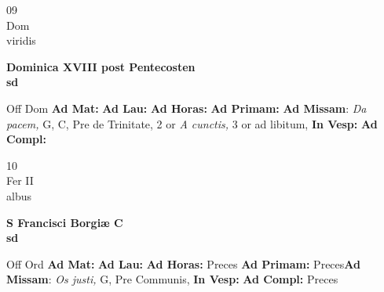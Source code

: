 \documentclass[10pt, openany]{book}
\begin{document}
    \begin{center}
        \begin{minipage}{3.5in}
            \vspace{2em}
            \begin{minipage}{0.5in}
                {\Huge 09} \\
                {\normalsize Dom} \\
                {\normalsize viridis}
            \end{minipage}
            \begin{minipage}{3.0in}
                \textbf{ \large Dominica XVIII post Pentecosten \\
                \textnormal{\normalsize sd}} \\ 
            \end{minipage}
            \begin{justify}Off Dom
                \textbf{Ad Mat: }
                \textbf{Ad Lau: }
                \textbf{Ad Horas: }
                \textbf{Ad Primam: }\textbf{Ad Missam}: \textit{Da pacem,} G, C, Pre de Trinitate, 2 or \textit{A cunctis,} 3 or ad libitum,  
                \textbf{In Vesp: }
                \textbf{Ad Compl: }
            \end{justify}
        \end{minipage}
    \end{center}

    \begin{center}
        \begin{minipage}{3.5in}
            \vspace{2em}
            \begin{minipage}{0.5in}
                {\Huge 10} \\
                {\normalsize Fer II} \\
                {\normalsize albus}
            \end{minipage}
            \begin{minipage}{3.0in}
                \textbf{ \large S Francisci Borgiæ C \\
                \textnormal{\normalsize sd}} \\ 
            \end{minipage}
            \begin{justify}Off Ord
                \textbf{Ad Mat: }
                \textbf{Ad Lau: }
                \textbf{Ad Horas: }Preces
                \textbf{Ad Primam: }Preces\textbf{Ad Missam}: \textit{Os justi,} G, Pre Communis,  
                \textbf{In Vesp: }
                \textbf{Ad Compl: }Preces
            \end{justify}
        \end{minipage}
    \end{center}
\end{document}
